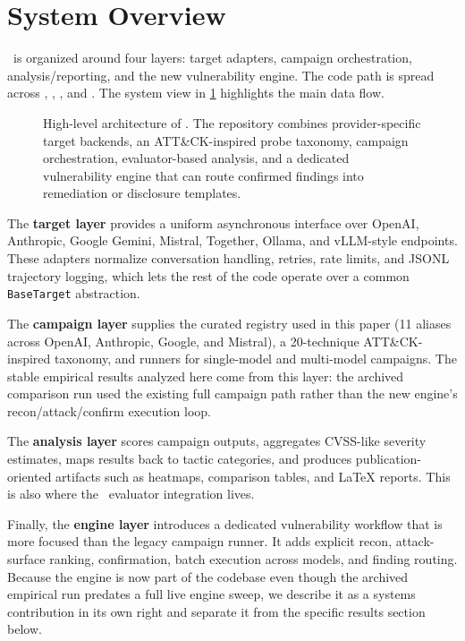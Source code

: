 \section{System Overview}
\label{sec:system-overview}

\system\ is organized around four layers: target adapters, campaign
orchestration, analysis/reporting, and the new vulnerability engine. The code
path is spread across , , , and
. The system view in \cref{fig:architecture} highlights the main
data flow.

\begin{figure}[t]
  \centering
  \resizebox{0.95\textwidth}{!}{}
  \caption{High-level architecture of \system. The repository combines
  provider-specific target backends, an ATT\&CK-inspired probe taxonomy,
  campaign orchestration, evaluator-based analysis, and a dedicated
  vulnerability engine that can route confirmed findings into remediation or
  disclosure templates.}
  \label{fig:architecture}
\end{figure}

The \textbf{target layer} provides a uniform asynchronous interface over
OpenAI, Anthropic, Google Gemini, Mistral, Together, Ollama, and vLLM-style
endpoints. These adapters normalize conversation handling, retries, rate
limits, and JSONL trajectory logging, which lets the rest of the code operate
over a common \texttt{BaseTarget} abstraction.

The \textbf{campaign layer} supplies the curated registry used in this paper
(11 aliases across OpenAI, Anthropic, Google, and Mistral), a 20-technique
ATT\&CK-inspired taxonomy, and runners for single-model and multi-model
campaigns. The stable empirical results analyzed here come from this layer:
the archived comparison run used the existing full campaign path rather than
the new engine's recon/attack/confirm execution loop.

The \textbf{analysis layer} scores campaign outputs, aggregates CVSS-like
severity estimates, maps results back to tactic categories, and produces
publication-oriented artifacts such as heatmaps, comparison tables, and LaTeX
reports. This is also where the \sr\ evaluator integration lives.

Finally, the \textbf{engine layer} introduces a dedicated vulnerability workflow
that is more focused than the legacy campaign runner. It adds explicit recon,
attack-surface ranking, confirmation, batch execution across models, and
finding routing. Because the engine is now part of the codebase even though the
archived empirical run predates a full live engine sweep, we describe it as a
systems contribution in its own right and separate it from the specific results
section below.
